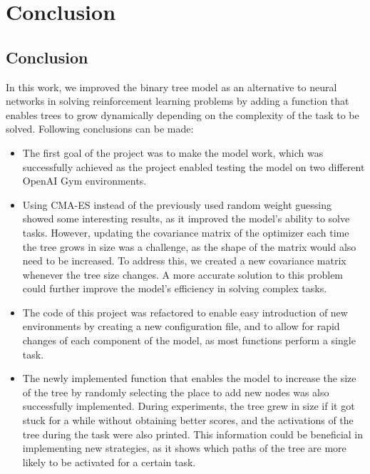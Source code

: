 
\chapter{Conclusion}
\label{ch:conclusions}

\section{Conclusion}
In this work, we improved the binary tree model as an alternative to neural networks in solving reinforcement learning problems by adding a function that enables trees to grow dynamically depending on the complexity of the task to be solved. Following conclusions can be made:

\begin{itemize}

\item The first goal of the project was to make the model work, which was successfully achieved as the project enabled testing the model on two different OpenAI Gym environments.

\item Using CMA-ES instead of the previously used random weight guessing showed some interesting results, as it improved the model's ability to solve tasks. However, updating the covariance matrix of the optimizer each time the tree grows in size was a challenge, as the shape of the matrix would also need to be increased. To address this, we created a new covariance matrix whenever the tree size changes. A more accurate solution to this problem could further improve the model's efficiency in solving complex tasks.

\item The code of this project was refactored to enable easy introduction of new environments by creating a new configuration file, and to allow for rapid changes of each component of the model, as most functions perform a single task.

\item The newly implemented function that enables the model to increase the size of the tree by randomly selecting the place to add new nodes was also successfully implemented. During experiments, the tree grew in size if it got stuck for a while without obtaining better scores, and the activations of the tree during the task were also printed. This information could be beneficial in implementing new strategies, as it shows which paths of the tree are more likely to be activated for a certain task.
\end{itemize}

